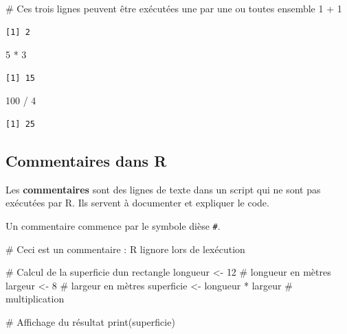 \documentclass[
  french,
  11pt,
  a4paper,
]{article}
\newenvironment{Shaded}{}{}
\newcommand{\CommentTok}[1]{\textcolor[rgb]{0.42,0.45,0.49}{#1}}
\newcommand{\DecValTok}[1]{\textcolor[rgb]{0.00,0.36,0.77}{#1}}
\newcommand{\FunctionTok}[1]{\textcolor[rgb]{0.44,0.26,0.76}{#1}}
\newcommand{\NormalTok}[1]{\textcolor[rgb]{0.14,0.16,0.18}{#1}}
\newcommand{\OtherTok}[1]{\textcolor[rgb]{0.44,0.26,0.76}{#1}}
\newcommand{\SpecialCharTok}[1]{\textcolor[rgb]{0.00,0.36,0.77}{#1}}
\begin{document}
\begin{Shaded}
\begin{Highlighting}[]
\CommentTok{\# Ces trois lignes peuvent être exécutées une par une ou toutes ensemble}
\DecValTok{1} \SpecialCharTok{+} \DecValTok{1}
\end{Highlighting}
\end{Shaded}

\begin{verbatim}
[1] 2
\end{verbatim}

\begin{Shaded}
\begin{Highlighting}[]
\DecValTok{5} \SpecialCharTok{*} \DecValTok{3}
\end{Highlighting}
\end{Shaded}

\begin{verbatim}
[1] 15
\end{verbatim}

\begin{Shaded}
\begin{Highlighting}[]
\DecValTok{100} \SpecialCharTok{/} \DecValTok{4}
\end{Highlighting}
\end{Shaded}

\begin{verbatim}
[1] 25
\end{verbatim}

\subsection{Commentaires dans R}\label{commentaires-dans-r}

Les \textbf{commentaires} sont des lignes de texte dans un script qui ne
sont pas exécutées par R. Ils servent à documenter et expliquer le code.

Un commentaire commence par le symbole dièse \texttt{\#}.

\begin{Shaded}
\begin{Highlighting}[]
\CommentTok{\# Ceci est un commentaire : R l\textquotesingle{}ignore lors de l\textquotesingle{}exécution}

\CommentTok{\# Calcul de la superficie d\textquotesingle{}un rectangle}
\NormalTok{longueur }\OtherTok{\textless{}{-}} \DecValTok{12}  \CommentTok{\# longueur en mètres}
\NormalTok{largeur }\OtherTok{\textless{}{-}} \DecValTok{8}    \CommentTok{\# largeur en mètres}
\NormalTok{superficie }\OtherTok{\textless{}{-}}\NormalTok{ longueur }\SpecialCharTok{*}\NormalTok{ largeur  }\CommentTok{\# multiplication}

\CommentTok{\# Affichage du résultat}
\FunctionTok{print}\NormalTok{(superficie)}
\end{Highlighting}
\end{Shaded}
\end{document}
